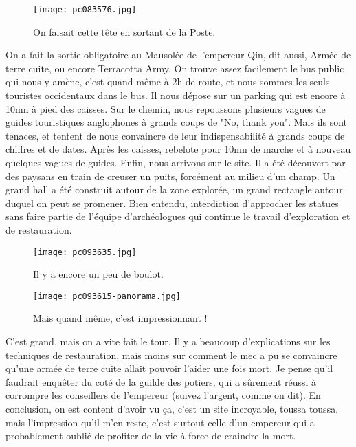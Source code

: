 \documentclass{book}
\begin{document}
\begin{figure}[h]
\centering
\texttt{[image: pc083576.jpg]}
\caption*{On faisait cette tête en sortant de la Poste.}
\end{figure}

On a fait la sortie obligatoire au Mausolée de l'empereur Qin, dit aussi, Armée de terre cuite, ou encore Terracotta Army. On trouve assez facilement le bus public qui nous y amène, c'est quand même à 2h de route, et nous sommes les seuls touristes occidentaux dans le bus. Il nous dépose sur un parking qui est encore à 10mn à pied des caisses. Sur le chemin, nous repoussons plusieurs vagues de guides touristiques anglophones à grands coups de "No, thank you". Mais ils sont tenaces, et tentent de nous convaincre de leur indispensabilité à grands coups de chiffres et de dates. Après les caisses, rebelote pour 10mn de marche et à nouveau quelques vagues de guides. Enfin, nous arrivons sur le site. Il a été découvert par des paysans en train de creuser un puits, forcément au milieu d'un champ. Un grand hall a été construit autour de la zone explorée, un grand rectangle autour duquel on peut se promener. Bien entendu, interdiction d'approcher les statues sans faire partie de l'équipe d'archéologues qui continue le travail d'exploration et de restauration.


\begin{figure}[h]
\centering
\texttt{[image: pc093635.jpg]}
\caption*{Il y a encore un peu de boulot.}
\end{figure}


\begin{figure}[h]
\centering
\texttt{[image: pc093615-panorama.jpg]}
\caption*{Mais quand même, c'est impressionnant !}
\end{figure}

C'est grand, mais on a vite fait le tour. Il y a beaucoup d'explications sur les techniques de restauration, mais moins sur comment le mec a pu se convaincre qu'une armée de terre cuite allait pouvoir l'aider une fois mort. Je pense qu'il faudrait enquêter du coté de la guilde des potiers, qui a sûrement réussi à corrompre les conseillers de l'empereur (suivez l'argent, comme on dit).
En conclusion, on est content d'avoir vu ça, c'est un site incroyable, toussa toussa, mais l'impression qu'il m'en reste, c'est surtout celle d'un empereur qui a probablement oublié de profiter de la vie à force de craindre la mort.
\end{document}
